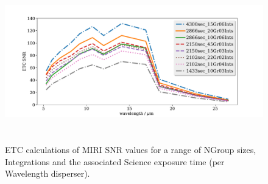 %

\begin{figure}
  \begin{center}
  \includegraphics[height=7.0cm,width=16.5cm]{../ETC_calcs/SNR_vs_wavelength_comparisons_full.pdf}
    \end{center}
    \caption{ETC calculations of MIRI SNR values for a range of NGroup
      sizes, Integrations and the associated Science exposure time (per
      Wavelength disperser). }
    \label{fig:test-fig}
  \end{figure}

